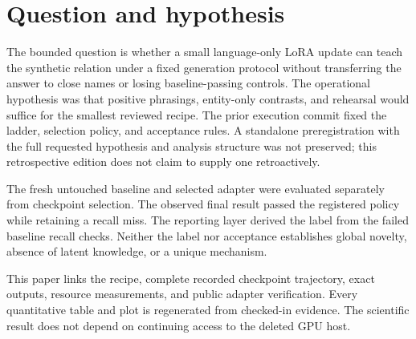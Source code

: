 \section{Question and hypothesis}
\label{sec:introduction}
The bounded question is whether a small language-only LoRA update can teach
the synthetic relation under a fixed generation protocol without transferring
the answer to close names or losing baseline-passing controls. The operational
hypothesis was that positive phrasings, entity-only contrasts, and rehearsal
would suffice for the smallest reviewed recipe. The prior execution commit
fixed the ladder, selection policy, and acceptance rules. A standalone
preregistration with the full requested hypothesis and analysis structure was
not preserved; this retrospective edition does not claim to supply one
retroactively.\citep{qwen38source}

The fresh untouched baseline and selected adapter were evaluated separately
from checkpoint selection. The observed final result passed the registered
policy while retaining a recall miss. The reporting layer derived the
 label from the failed baseline recall
checks. Neither the label nor acceptance establishes global novelty, absence
of latent knowledge, or a unique mechanism.

This paper links the recipe, complete recorded checkpoint trajectory, exact
outputs, resource measurements, and public adapter verification. Every
quantitative table and plot is regenerated from checked-in evidence. The
scientific result does not depend on continuing access to the deleted GPU
host.
